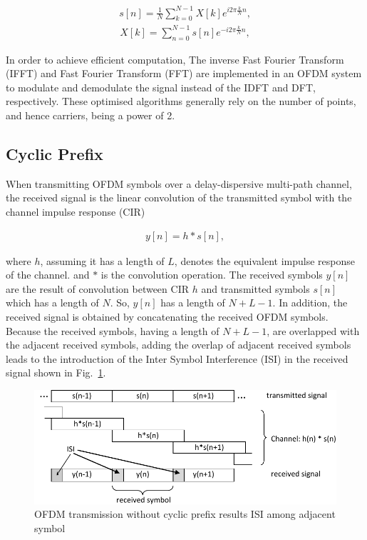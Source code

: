 \begin{eqnarray}
\label{equ:sampledOFDMsignal}
s[n] = \frac{1}{N}\sum_{k=0}^{N-1} X[k] e^{i2\pi\frac{k}{N}n},
\end{eqnarray} 
\begin{eqnarray}
\label{equ:sampledOFDMsignal}
X[k] = \sum_{n=0}^{N-1} s[n] e^{-i2\pi\frac{k}{N}n},
\end{eqnarray} 

In order to achieve efficient computation, The inverse Fast Fourier Transform (IFFT) and Fast Fourier Transform (FFT) are implemented in an OFDM system to modulate and demodulate the signal instead of the IDFT and DFT, respectively. These optimised algorithms generally rely on the number of points, and hence carriers, being a power of 2.

\subsection{Cyclic Prefix}

When transmitting OFDM symbols over a delay-dispersive multi-path channel, the received signal is the linear convolution of the transmitted symbol with the channel impulse
response (CIR) 

\begin{eqnarray}
\label{equ:sampledOFDMsignal}
y[n] = h*s[n],
\end{eqnarray} 

where $h$, assuming it has a length of $L$, denotes the equivalent impulse response of the channel. and $*$ is the convolution operation. 
The received symbols $y[n]$ are the result of convolution between CIR $h$ and transmitted symbols $s[n]$ which has a length of $N$.
So,  $y[n]$ has a length of $N+L-1$.
In addition, the received signal is obtained by concatenating the received OFDM symbols. 
Because the received symbols, having a length of $N+L-1$, are overlapped with the adjacent received symbols, adding the overlap of adjacent received symbols leads to the introduction of the Inter Symbol Interference (ISI) in the received signal shown in Fig.~\ref{fig:CIR-noCP}.


\begin{figure}
	\centerline{\includegraphics [width=0.8\columnwidth] {Figures/CIR_noCP.pdf} }
	\caption{OFDM transmission without cyclic prefix results ISI among adjacent symbol}
	\label{fig:CIR-noCP}
\end{figure}

